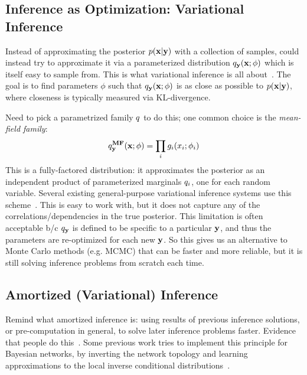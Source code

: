\subsection{Inference as Optimization: Variational Inference}
\label{sec:background:variational}

Instead of approximating the posterior $p(\mathbf{x} | \mathbf{y})$ with a collection of samples, could instead try to approximate it via a parameterized distribution $q_{\mathbf{y}}(\mathbf{x} ; \phi)$ which is itself easy to sample from.
This is what variational inference is all about~\cite{VariationalInference}.
The goal is to find parameters $\phi$ such that $q_{\mathbf{y}}(\mathbf{x} ; \phi)$ is as close as possible to $p(\mathbf{x} | \mathbf{y})$, where closeness is typically measured via KL-divergence.

Need to pick a parametrized family $q$ to do this; one common choice is the \emph{mean-field family}:
\begin{equation*}
q^{\textbf{MF}}_{\mathbf{y}}(\mathbf{x} ; \phi) = \prod_i g_i(x_i ; \phi_i)
\end{equation*}
This is a fully-factored distribution: it approximates the posterior as an independent product of parameterized marginals $q_i$, one for each random variable.
Several existing general-purpose variational inference systems use this scheme~\cite{AVIPP,BBVI}.
This is easy to work with, but it does not capture any of the correlations/dependencies in the true posterior.
This limitation is often acceptable b/c $q_{\mathbf{y}}$ is defined to be specific to a particular $\mathbf{y}$, and thus the parameters are re-optimized for each new $\mathbf{y}$.
So this gives us an alternative to Monte Carlo methods (e.g. MCMC) that can be faster and more reliable, but it is still solving inference problems from scratch each time.

\subsection{Amortized (Variational) Inference}

Remind what amortized inference is: using results of previous inference solutions, or pre-computation in general, to solve later inference problems faster.
Evidence that people do this~\cite{AmortizedInference}.
Some previous work tries to implement this principle for Bayesian networks, by inverting the network topology and learning approximations to the local inverse conditional distributions~\cite{StochasticInverses,NeuralStochasticInverses}.

